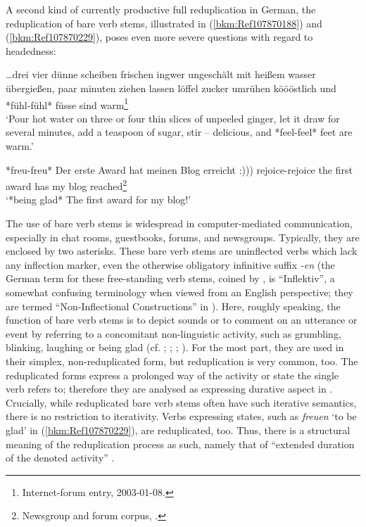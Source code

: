 \documentclass[output=paper
  ,nobabel
  ,draftmode
  ,colorlinks, citecolor=brown
]{langscibook}
\begin{document}
A second kind of currently productive full reduplication in German, the reduplication of bare verb
stems, illustrated in (\ref{bkm:Ref107870188}) and (\ref{bkm:Ref107870229}), poses even more severe
questions with regard to headedness:

\ea
\label{bkm:Ref107870188}%
\ldots drei vier dünne scheiben frischen ingwer ungeschält mit heißem wasser übergießen, paar minuten ziehen lassen löffel zucker umrühen köööstlich und *fühl-fühl* füsse sind warm\footnote{Internet-forum entry, 2003-01-08.}\\
`Pour hot water on three or four thin slices of unpeeled ginger, let it draw for several minutes, add a teaspoon of sugar, stir – delicious, and *feel-feel* feet are warm.'
\z

\ea
\label{bkm:Ref107870229}%
*freu-freu*        Der erste Award hat  meinen Blog  erreicht :)))    rejoice-rejoice   the  first award   has  my       blog   reached\footnote{Newsgroup and forum corpus, .} \\
`*being glad* The first award for my blog!'
\z

\noindent
The use of bare verb stems is widespread in computer-mediated communication, especially in chat
rooms, guestbooks, forums, and newsgroups. Typically, they are enclosed by two asterisks. These bare
verb stems are uninflected verbs which lack any inflection marker, even the otherwise obligatory
infinitive suffix \emph{{}-en} (the German term for these free-standing verb stems, coined by
\citet{Teuber1999}, is ``Inflektiv'', a somewhat confusing terminology when viewed from an English
perspective; they are termed ``Non-Inflectional Constructions'' in ). Here,
roughly speaking, the function of bare verb stems is to depict sounds or to comment on an utterance
or event by referring to a concomitant non-linguistic activity, such as grumbling, blinking,
laughing or being glad (cf. \citealt[22--25]{Teuber1999}; \citealt[193--206]{Schlobinski2001};
\citealt[116–121]{Pankow2003}; \citealt[76–82]{BueckingRau2013}). For the most part, they are used in
their simplex, non-reduplicated form, but reduplication is very common, too. The reduplicated forms
express a prolonged way of the activity or state the single verb refers to; therefore they are
analysed as expressing durative aspect in . Crucially, while reduplicated
bare verb stems often have such iterative semantics, there is no restriction to iterativity. Verbs
expressing states, such as \emph{freuen} `to be glad' in (\ref{bkm:Ref107870229}), are reduplicated,
too. Thus, there is a structural meaning of the reduplication process as such, namely that of
``extended duration of the denoted activity'' \citep[936]{Freywald2015}.
\end{document}
